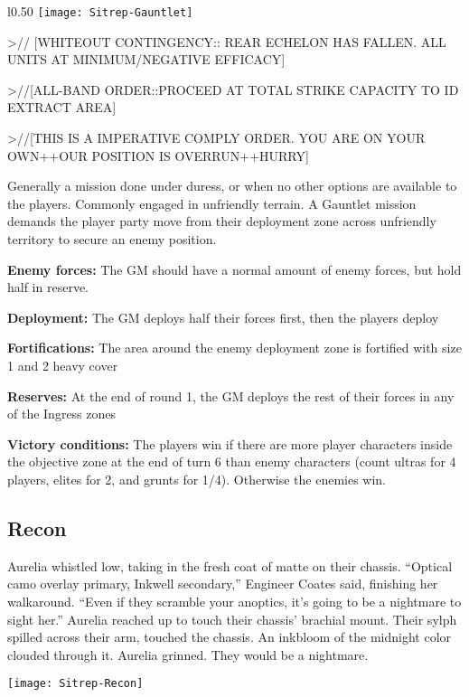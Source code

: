  \begin{wrapfigure}{l}{0.50\textwidth}
   \centering
   \texttt{[image: Sitrep-Gauntlet]}
 \end{wrapfigure}

>// [WHITEOUT CONTINGENCY:: REAR ECHELON HAS FALLEN. ALL UNITS AT
MINIMUM/NEGATIVE EFFICACY]

>//[ALL-BAND ORDER::PROCEED AT TOTAL STRIKE CAPACITY TO ID EXTRACT AREA]

>//[THIS IS A IMPERATIVE COMPLY ORDER. YOU ARE ON YOUR OWN++OUR POSITION IS
OVERRUN++HURRY]

Generally a mission done under duress, or when no other options are available to the players. Commonly engaged in unfriendly terrain. A Gauntlet mission demands the player party move from their deployment zone across unfriendly territory to secure an enemy position.

\textbf{Enemy forces:} The GM should have a normal amount of enemy forces, but hold half in reserve.

\textbf{Deployment:} The GM deploys half their forces first, then the players deploy

\textbf{Fortifications:} The area around the enemy deployment zone is fortified with size 1 and 2 heavy cover

\textbf{Reserves:} At the end of round 1, the GM deploys the rest of their forces in any of the Ingress zones

\textbf{Victory conditions:} The players win if there are more player characters inside the objective zone at the end of turn 6 than enemy characters (count ultras for 4 players, elites for 2, and grunts for 1/4). Otherwise the enemies win.

 \newpage
 \subsection{Recon}
 Aurelia whistled low, taking in the fresh coat of matte on their chassis. “Optical camo overlay primary, Inkwell secondary,” Engineer Coates said, finishing her walkaround. “Even if they scramble your anoptics, it’s going to be a nightmare to sight her.” Aurelia reached up to touch their chassis’ brachial mount. Their sylph spilled across their arm, touched the chassis. An inkbloom of the midnight color clouded through it. Aurelia grinned. They would be a nightmare.

 \begin{center}
   \texttt{[image: Sitrep-Recon]}
 \end{center}

